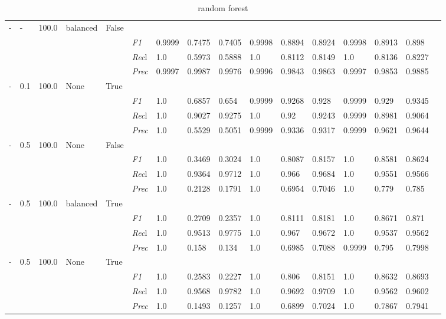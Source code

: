 \begin{table}[]
\begin{tabularx}{\textwidth}{XXXXX|X|XXX|XXX|XXXX}
- & - & 100.0 & balanced & False& & & & & & & & & \\
& & & & & \textit{F1} & 0.9999 & 0.7475 & 0.7405 & 0.9998 & 0.8894        & 0.8924        & 0.9998        & 0.8913        & 0.898        \\
& & & & & \textit{Rec}l & 1.0 & 0.5973 & 0.5888    & 1.0 & 0.8112    & 0.8149    & 1.0    & 0.8136    & 0.8227    \\
& & & & & \textit{Prec} & 0.9997 & 0.9987 & 0.9976 & 0.9996 & 0.9843 & 0.9863 & 0.9997 & 0.9853 & 0.9885 \\ \midrule
- & 0.1 & 100.0 & None & True& & & & & & & & & \\
& & & & & \textit{F1} & 1.0 & 0.6857 & 0.654 & 0.9999 & 0.9268        & 0.928        & 0.9999        & 0.929        & 0.9345        \\
& & & & & \textit{Rec}l & 1.0 & 0.9027 & 0.9275    & 1.0 & 0.92    & 0.9243    & 0.9999    & 0.8981    & 0.9064    \\
& & & & & \textit{Prec} & 1.0 & 0.5529 & 0.5051 & 0.9999 & 0.9336 & 0.9317 & 0.9999 & 0.9621 & 0.9644 \\ \midrule
- & 0.5 & 100.0 & None & False& & & & & & & & & \\
& & & & & \textit{F1} & 1.0 & 0.3469 & 0.3024 & 1.0 & 0.8087        & 0.8157        & 1.0        & 0.8581        & 0.8624        \\
& & & & & \textit{Rec}l & 1.0 & 0.9364 & 0.9712    & 1.0 & 0.966    & 0.9684    & 1.0    & 0.9551    & 0.9566    \\
& & & & & \textit{Prec} & 1.0 & 0.2128 & 0.1791 & 1.0 & 0.6954 & 0.7046 & 1.0 & 0.779 & 0.785 \\ \midrule
- & 0.5 & 100.0 & balanced & True& & & & & & & & & \\
& & & & & \textit{F1} & 1.0 & 0.2709 & 0.2357 & 1.0 & 0.8111        & 0.8181        & 1.0        & 0.8671        & 0.871        \\
& & & & & \textit{Rec}l & 1.0 & 0.9513 & 0.9775    & 1.0 & 0.967    & 0.9672    & 1.0    & 0.9537    & 0.9562    \\
& & & & & \textit{Prec} & 1.0 & 0.158 & 0.134 & 1.0 & 0.6985 & 0.7088 & 0.9999 & 0.795 & 0.7998 \\ \midrule
- & 0.5 & 100.0 & None & True& & & & & & & & & \\
& & & & & \textit{F1} & 1.0 & 0.2583 & 0.2227 & 1.0 & 0.806        & 0.8151        & 1.0        & 0.8632        & 0.8693        \\
& & & & & \textit{Rec}l & 1.0 & 0.9568 & 0.9782    & 1.0 & 0.9692    & 0.9709    & 1.0    & 0.9562    & 0.9602    \\
& & & & & \textit{Prec} & 1.0 & 0.1493 & 0.1257 & 1.0 & 0.6899 & 0.7024 & 1.0 & 0.7867 & 0.7941 \\ \midrule
\end{tabularx}
\caption{random forest}
\label{tab:all_results_random_forest}
\end{table}

